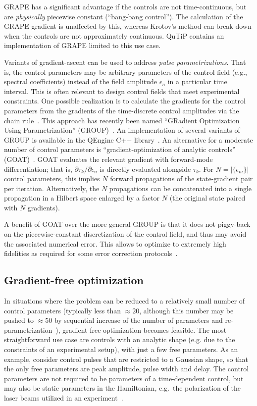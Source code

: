 \documentclass[submission, Phys]{SciPost}
\newcommand{\Abs}[1]{\left\vert#1\right\vert}
\begin{document}
GRAPE has a significant advantage if the controls are not time-continuous, but
are \emph{physically} piecewise constant (``bang-bang control''). The
calculation of the GRAPE-gradient is unaffected by this, whereas Krotov's method
can break down when the controls are not approximately continuous.
QuTiP contains an implementation of GRAPE limited to this use case.

Variants of gradient-ascent can be used to address \emph{pulse
parametrizations}.
That is, the control parameters may be arbitrary parameters of the control field
(e.g., spectral coefficients) instead of the field amplitude $\epsilon_n$ in a
particular time interval.
This is often relevant to design control fields that meet experimental
constraints.
One possible realization  is to calculate the gradients for the control
parameters from the gradients of the time-discrete control amplitudes via the
chain rule~\cite{WinckelIP2008,SkinnerJMR2010,MotzoiPRA2011,LucarelliPRA2018}.
This approach has recently been named  ``GRadient Optimization Using
Parametrization'' (GROUP)~\cite{SorensenPRA2018}.
An implementation of several variants of GROUP is available in the QEngine C++
library~\cite{SorensenCPC2019}.
An alternative for a moderate number of control parameters is
``gradient-optimization of analytic controls'' (GOAT)~\cite{MachnesPRL2018}.
GOAT evaluates the relevant gradient with forward-mode differentiation; that is,
${\partial \tau_k}/{\partial \epsilon_n}$ is directly evaluated alongside
$\tau_k$.
For $N = \Abs{\{\epsilon_m\}}$ control parameters, this implies $N$ forward
propagations of the state-gradient pair per iteration.
Alternatively, the $N$ propagations can be concatenated into a single
propagation in a Hilbert space enlarged by a factor $N$ (the original state
paired with $N$ gradients).

A benefit of GOAT over the more general GROUP is that it does not piggy-back on
the piecewise-constant discretization of the control field, and thus may avoid
the associated numerical error.
This allows to optimize to extremely high fidelities as required for some error
correction protocols~\cite{MachnesPRL2018}.
\subsection{Gradient-free optimization}%
\label{sec:comparison_gradientfree}

In situations where the problem can be reduced to a relatively small number of
control parameters (typically less than $\approx20$, although this number may be
pushed to $\approx50$ by sequential increase of the number of parameters and
re-parametrization~\cite{RachPRA2015,GoetzPRA2016}), gradient-free optimization
becomes feasible.
The most straightforward use case are controls with an analytic shape (e.g.
due to the constraints of an experimental setup), with just a few free
parameters.
As an example, consider control pulses that are restricted to a Gaussian shape,
so that the only free parameters are peak amplitude, pulse width and delay.
The control parameters are not required to be parameters of a time-dependent
control, but may also be static parameters in the Hamiltonian, e.g.\ the
polarization of the laser beams utilized in an experiment~\cite{HornNJP2018}.
\end{document}
